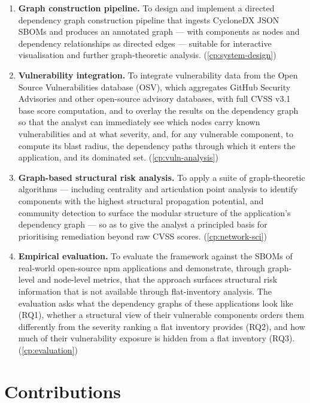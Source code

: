 \begin{enumerate}
    \item \textbf{Graph construction pipeline.} To design and implement a directed dependency graph construction pipeline that ingests CycloneDX JSON SBOMs and produces an annotated graph --- with components as nodes and dependency relationships as directed edges --- suitable for interactive visualisation and further graph-theoretic analysis. (\autoref{cp:system-design})
    \item \textbf{Vulnerability integration.} To integrate vulnerability data from the Open Source Vulnerabilities database (OSV), which aggregates GitHub Security Advisories and other open-source advisory databases, with full CVSS v3.1 base score computation, and to overlay the results on the dependency graph so that the analyst can immediately see which nodes carry known vulnerabilities and at what severity, and, for any vulnerable component, to compute its blast radius, the dependency paths through which it enters the application, and its dominated set. (\autoref{cp:vuln-analysis})
    \item \textbf{Graph-based structural risk analysis.} To apply a suite of graph-theoretic algorithms --- including centrality and articulation point analysis to identify components with the highest structural propagation potential, and community detection to surface the modular structure of the application's dependency graph --- so as to give the analyst a principled basis for prioritising remediation beyond raw CVSS scores. (\autoref{cp:network-sci})
    \item \textbf{Empirical evaluation.} To evaluate the framework against the SBOMs of real-world open-source npm applications and demonstrate, through graph-level and node-level metrics, that the approach surfaces structural risk information that is not available through flat-inventory analysis. The evaluation asks what the dependency graphs of these applications look like (RQ1), whether a structural view of their vulnerable components orders them differently from the severity ranking a flat inventory provides (RQ2), and how much of their vulnerability exposure is hidden from a flat inventory (RQ3). (\autoref{cp:evaluation})
\end{enumerate}


\section{Contributions}
\label{sec:contributions}

